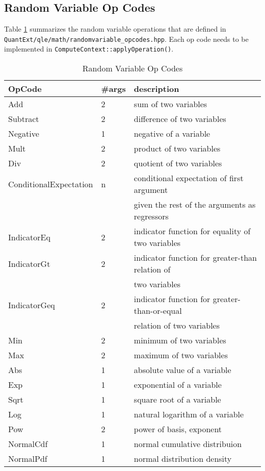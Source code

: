 \documentclass[12pt, a4paper]{article}
\begin{document}
\subsection{Random Variable Op Codes}\label{randomVariableOpCodes}

Table \ref{tab_opcodes} summarizes the random variable operations that are defined in
\verb+QuantExt/qle/math/randomvariable_opcodes.hpp+. Each op code needs to be implemented in
\verb+ComputeContext::applyOperation()+.

\begin{table}[ht]
  \begin{flushleft}
    \begin{tabular}{|l|l|l|}
      \hline
      OpCode & \#args & description \\ \hline
      Add & 2 & sum of two variables \\ \hline
      Subtract & 2 & difference of two variables \\ \hline
      Negative & 1 & negative of a variable \\ \hline
      Mult & 2 & product of two variables \\ \hline
      Div & 2 & quotient of two variables \\ \hline
      ConditionalExpectation & n & conditional expectation of first argument\\ & & given the rest of the arguments as regressors \\ \hline
      IndicatorEq & 2 & indicator function for equality of two variables \\ \hline
      IndicatorGt & 2 & indicator function for greater-than relation of\\ & & two variables \\ \hline
      IndicatorGeq & 2 & indicator function for greater-than-or-equal\\ & & relation of two variables \\ \hline
      Min & 2 & minimum of two variables \\ \hline
      Max & 2 & maximum of two variables \\ \hline
      Abs & 1 & absolute value of a variable \\ \hline
      Exp & 1 & exponential of a variable \\ \hline
      Sqrt & 1 & square root of a variable \\ \hline
      Log & 1 & natural logarithm of a variable \\ \hline
      Pow & 2 & power of basis, exponent \\ \hline
      NormalCdf & 1 & normal cumulative distribuion \\ \hline
      NormalPdf & 1 & normal distribution density\\ \hline
    \end{tabular}
  \end{flushleft}
\caption{Random Variable Op Codes}
\label{tab_opcodes}
\end{table}
\end{document}
